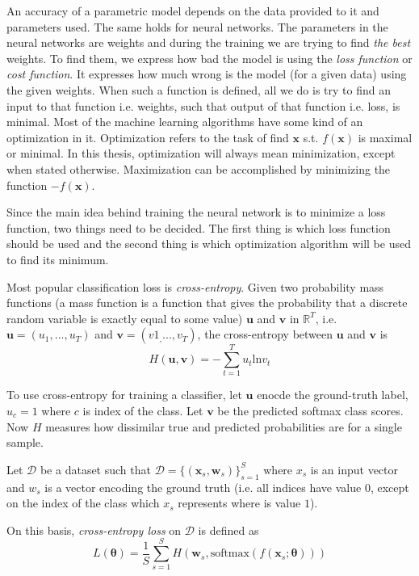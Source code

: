 An accuracy of a parametric model depends on the data provided to it and  parameters used. The same holds for neural networks. The parameters in the neural networks are weights and during the training we are trying to find \textit{the best} weights. To find them, we express how bad the model is using the \textit{loss function} or \textit{cost function}. It expresses how much wrong is the model (for a given data) using the given weights. When such a function is defined, all we do is try to find an input to that function i.e. weights, such that output of that function i.e. loss, is minimal. Most of the machine learning algorithms have some kind of an optimization in it. Optimization refers to the task of find $\pmb x$ s.t. $f(\pmb x)$ is maximal or minimal. In this thesis, optimization will always mean minimization, except when stated otherwise. Maximization can be accomplished by minimizing the function $-f(\pmb x)$.

Since the main idea behind training the neural network is to minimize a loss function, two things need to be decided. The first thing is which loss function should be used and the second thing is which optimization algorithm will be used to find its minimum.

Most popular classification loss is \textit{cross-entropy}. Given two probability mass functions (a mass function is a function that gives the probability that a discrete random variable is exactly equal to some value) $\pmb u$ and $\pmb v$ in $\mathbb{R}^T$, i.e. $\pmb u = (u_1, ..., u_T)$ and $\pmb v =  (v1_, ..., v_T)$, the cross-entropy between $\pmb u$ and $\pmb v$ is
 \begin{equation}
H (\pmb u, \pmb v)= - \sum_{t=1}^T  u_t  \text{ln} v_t 
\end{equation}

To use cross-entropy for training a classifier, let $\pmb u$ enocde the ground-truth label, $u_c = 1$ where $c$ is index of the class. Let $\pmb v$ be the predicted softmax class scores. Now $H$ measures how dissimilar true and predicted probabilities are for a single sample.

Let $\mathcal{D}$ be a dataset such that
$ \mathcal{D} = \{ (\pmb x_s, \pmb w_s)\}_{s=1}^{S}$ where $x_s$ is an input vector and $w_s$ is a vector encoding the ground truth (i.e. all indices have value $0$, except on the index of the class which $x_s$ represents where is value $1$).

On this basis, \textit{cross-entropy loss} on $\mathcal{D}$ is defined as
\begin{equation} \label{eq:loss-function}
L(\pmb \theta) = \frac{1}{S} \sum_{s=1}^{S} H (\pmb w_s, \text{softmax} (f(\pmb x_s ; \pmb \theta)))
\end{equation}

